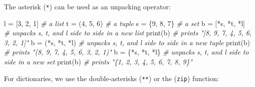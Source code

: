 \documentclass[
]{article}
\newenvironment{Shaded}{}{}
\newcommand{\BuiltInTok}[1]{#1}
\newcommand{\CommentTok}[1]{\textcolor[rgb]{0.38,0.63,0.69}{\textit{#1}}}
\newcommand{\DecValTok}[1]{\textcolor[rgb]{0.25,0.63,0.44}{#1}}
\newcommand{\NormalTok}[1]{#1}
\newcommand{\OperatorTok}[1]{\textcolor[rgb]{0.40,0.40,0.40}{#1}}
\begin{document}
The asterisk (\texttt{*}) can be used as an unpacking operator:

\begin{Shaded}
\begin{Highlighting}[]
\NormalTok{l }\OperatorTok{=}\NormalTok{ [}\DecValTok{3}\NormalTok{, }\DecValTok{2}\NormalTok{, }\DecValTok{1}\NormalTok{]     }\CommentTok{\# a list}
\NormalTok{t }\OperatorTok{=}\NormalTok{ (}\DecValTok{4}\NormalTok{, }\DecValTok{5}\NormalTok{, }\DecValTok{6}\NormalTok{)     }\CommentTok{\# a tuple}
\NormalTok{s }\OperatorTok{=}\NormalTok{ \{}\DecValTok{9}\NormalTok{, }\DecValTok{8}\NormalTok{, }\DecValTok{7}\NormalTok{\}     }\CommentTok{\# a set}
\NormalTok{b }\OperatorTok{=}\NormalTok{ [}\OperatorTok{*}\NormalTok{s, }\OperatorTok{*}\NormalTok{t, }\OperatorTok{*}\NormalTok{l]  }\CommentTok{\# unpacks s, t, and l side to side in a new list}
\BuiltInTok{print}\NormalTok{(b)          }\CommentTok{\# prints "[8, 9, 7, 4, 5, 6, 3, 2, 1]"}
\NormalTok{b }\OperatorTok{=}\NormalTok{ (}\OperatorTok{*}\NormalTok{s, }\OperatorTok{*}\NormalTok{t, }\OperatorTok{*}\NormalTok{l)  }\CommentTok{\# unpacks s, t, and l side to side in a new tuple}
\BuiltInTok{print}\NormalTok{(b)          }\CommentTok{\# prints "(8, 9, 7, 4, 5, 6, 3, 2, 1)"}
\NormalTok{b }\OperatorTok{=}\NormalTok{ \{}\OperatorTok{*}\NormalTok{s, }\OperatorTok{*}\NormalTok{t, }\OperatorTok{*}\NormalTok{l\}  }\CommentTok{\# unpacks s, t, and l side to side in a new set}
\BuiltInTok{print}\NormalTok{(b)          }\CommentTok{\# prints "\{1, 2, 3, 4, 5, 6, 7, 8, 9\}"}
\end{Highlighting}
\end{Shaded}

For dictionaries, we use the double-asterisks (\texttt{**}) or the
(\texttt{zip}) function:
\end{document}
